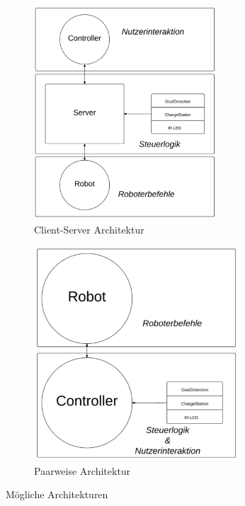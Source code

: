 \begin{figure}[h!]
	\centering
	\begin{subfigure}{0.45\textwidth}
		\includegraphics[height = 8cm]{images/client-server_architektur.pdf}
		\caption{Client-Server Architektur}
		\label{fig:client-server_architektur}
	\end{subfigure}
	\quad
	\begin{subfigure}{0.45\textwidth}
		\includegraphics[height = 8cm]{images/paarweise_architektur.pdf}
		\caption{Paarweise Architektur}
		\label{fig:paarweise_architektur}
	\end{subfigure}
	
	\caption{Mögliche Architekturen}
\end{figure}
\vspace{1cm}


